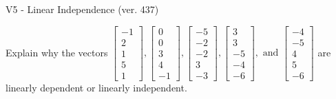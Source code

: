\begin{exercise}
  \begin{exerciseTitle}V5 - Linear Independence (ver. 437)\end{exerciseTitle}
  \begin{exerciseStatement}
    Explain why the vectors \(\left[\begin{array}{r}
-1 \\
2 \\
1 \\
5 \\
1
\end{array}\right] , \left[\begin{array}{r}
0 \\
0 \\
3 \\
4 \\
-1
\end{array}\right] , \left[\begin{array}{r}
-5 \\
-2 \\
-2 \\
3 \\
-3
\end{array}\right] , \left[\begin{array}{r}
3 \\
3 \\
-5 \\
-4 \\
-6
\end{array}\right] , \text{ and } \left[\begin{array}{r}
-4 \\
-5 \\
4 \\
5 \\
-6
\end{array}\right]\) are linearly dependent or linearly independent.	



\end{exerciseStatement}
\end{exercise}
